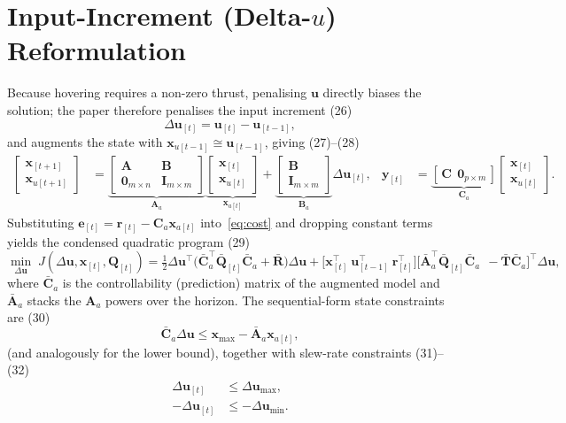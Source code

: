 \documentclass[12pt,a4paper]{report}
\begin{document}
\section{Input-Increment (Delta-\texorpdfstring{$u$}{u}) Reformulation}
Because hovering requires a non-zero thrust, penalising $\bm{u}$ directly biases the solution; the paper therefore penalises the input increment (26)
\begin{equation}
\Delta\bm{u}_{[t]} = \bm{u}_{[t]} - \bm{u}_{[t-1]},
\end{equation}
and augments the state with $\bm{x}_{u[t-1]}\cong\bm{u}_{[t-1]}$, giving (27)--(28)
\begin{align}
\begin{bmatrix}\bm{x}_{[t+1]}\\\bm{x}_{u[t+1]}\end{bmatrix}
&= \underbrace{\begin{bmatrix}\bm{A} & \bm{B}\\ \bm{0}_{m\times n} & \bm{I}_{m\times m}\end{bmatrix}}_{\bm{A}_a}
\underbrace{\begin{bmatrix}\bm{x}_{[t]}\\\bm{x}_{u[t]}\end{bmatrix}}_{\bm{x}_{a[t]}}
+ \underbrace{\begin{bmatrix}\bm{B}\\ \bm{I}_{m\times m}\end{bmatrix}}_{\bm{B}_a}\Delta\bm{u}_{[t]}, &
\bm{y}_{[t]} &= \underbrace{[\,\bm{C}\ \ \bm{0}_{p\times m}\,]}_{\bm{C}_a}\begin{bmatrix}\bm{x}_{[t]}\\\bm{x}_{u[t]}\end{bmatrix}.
\end{align}
Substituting $\bm{e}_{[t]}=\bm{r}_{[t]}-\bm{C}_a\bm{x}_{a[t]}$ into~\eqref{eq:cost} and dropping constant terms yields the condensed quadratic program (29)
\begin{equation}\label{eq:qp}
\min_{\Delta\bm{u}}\; J(\Delta\bm{u},\bm{x}_{[t]},\bm{Q}_{[t]}) = \tfrac{1}{2}\Delta\bm{u}^\top\big(\bar{\bm{C}}_a^\top\bar{\bm{Q}}_{[t]}\bar{\bm{C}}_a + \bar{\bm{R}}\big)\Delta\bm{u} + \big[\bm{x}_{[t]}^\top\ \bm{u}_{[t-1]}^\top\ \bm{r}_{[t]}^\top\big]\big[\bar{\bm{A}}_a^\top\bar{\bm{Q}}_{[t]}\bar{\bm{C}}_a\ \ -\bar{\bm{T}}\bar{\bm{C}}_a\big]^\top\Delta\bm{u},
\end{equation}
where $\bar{\bm{C}}_a$ is the controllability (prediction) matrix of the augmented model and $\bar{\bm{A}}_a$ stacks the $\bm{A}_a$ powers over the horizon. The sequential-form state constraints are (30)
\begin{equation}\label{eq:statecon}
\bar{\bm{C}}_a\Delta\bm{u} \le \bm{x}_{\max} - \bar{\bm{A}}_a\bm{x}_{a[t]},
\end{equation}
(and analogously for the lower bound), together with slew-rate constraints (31)--(32)
\begin{align}
\Delta\bm{u}_{[t]} &\le \Delta\bm{u}_{\max}, \label{eq:slewhi}\\
-\Delta\bm{u}_{[t]} &\le -\Delta\bm{u}_{\min}. \label{eq:slewlo}
\end{align}
\end{document}
